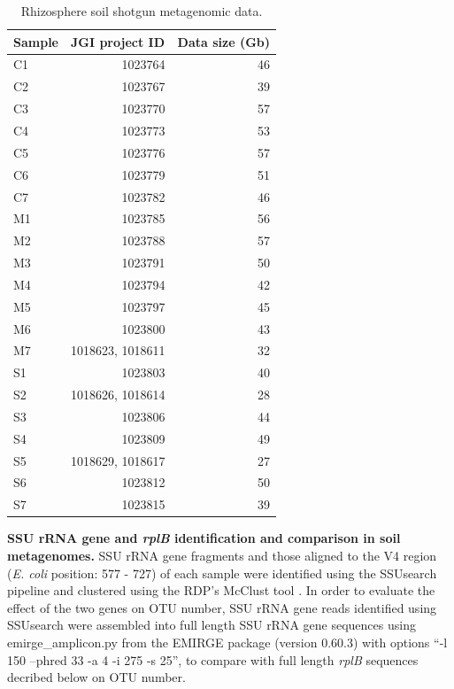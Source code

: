 \documentclass[]{msu-thesis}
\begin{document}
\begin{table}[htbp]
  \centering
  \caption[Rhizosphere soil shotgun metagenomic data]{Rhizosphere soil shotgun metagenomic data. }
    \begin{tabular}{|lrr|}
    \toprule
    Sample & \multicolumn{1}{l}{JGI project ID} & \multicolumn{1}{l|}{Data size (Gb)} \\
    \midrule
    C1    & 1023764 & 46 \\
    C2    & 1023767 & 39 \\
    C3    & 1023770 & 57 \\
    C4    & 1023773 & 53 \\
    C5    & 1023776 & 57 \\
    C6    & 1023779 & 51 \\
    C7    & 1023782 & 46 \\
    M1    & 1023785 & 56 \\
    M2    & 1023788 & 57 \\
    M3    & 1023791 & 50 \\
    M4    & 1023794 & 42 \\
    M5    & 1023797 & 45 \\
    M6    & 1023800 & 43 \\
    M7    & \multicolumn{1}{l}{1018623, 1018611} & 32 \\
    S1    & 1023803 & 40 \\
    S2    & \multicolumn{1}{l}{1018626, 1018614} & 28 \\
    S3    & 1023806 & 44 \\
    S4    & 1023809 & 49 \\
    S5    & \multicolumn{1}{l}{1018629, 1018617} & 27 \\
    S6    & 1023812 & 50 \\
    S7    & 1023815 & 39 \\
    \bottomrule
    \end{tabular}%
  \label{tab:S1}%
\end{table}%



\textbf{SSU rRNA gene and \textit{rplB} identification and comparison in soil metagenomes. }
SSU rRNA gene fragments and those aligned to the V4 region (\textit{E. coli} position: 577 - 727) of each sample were identified using the SSUsearch pipeline \cite{guo_microbial_2015} and clustered using the RDP's McClust tool \cite{cole_ribosomal_2014}. In order to evaluate the effect of the two genes on OTU number, SSU rRNA gene reads identified using SSUsearch were assembled into full length SSU rRNA gene sequences using emirge\_amplicon.py from the EMIRGE package (version 0.60.3) \cite{miller_short-read_2013} with options ``-l 150 --phred 33 -a 4 -i 275 -s 25'', to compare with full length \textit{rplB} sequences decribed below on OTU number.
\end{document}
